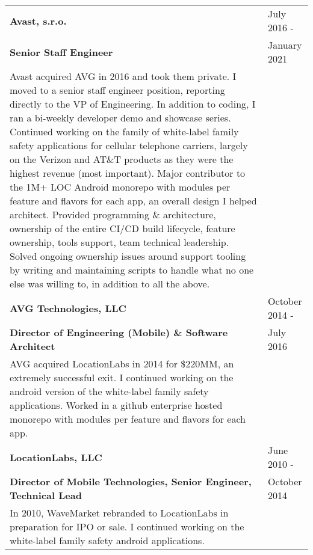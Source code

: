 \begin{tabular}{p{5.2in}@{\hspace{1.5cm}}l}

	\bf  Avast, s.r.o. 	    & July 2016 -  \\
	\bf  Senior Staff Engineer	& January 2021 \\[4pt]
	
	   Avast acquired AVG in 2016 and took them private.  I moved to a senior staff engineer position,
	   reporting directly to the VP of Engineering.  In addition to coding, I ran a bi-weekly developer demo
	   and showcase series.
	   Continued working on the family of white-label family safety applications for cellular
	   telephone carriers, largely on the Verizon and AT\&T products as they were the highest revenue (most important).
	   Major contributor to the 1M+ LOC Android monorepo with modules per feature and flavors for each app,
	   an overall design I helped architect.
	   Provided programming \& architecture, 
		ownership of the entire CI/CD build lifecycle, feature ownership, tools support, team 
		technical leadership. Solved ongoing ownership issues around support tooling by writing and maintaining 
		scripts to handle what no one else was willing to, in addition to all the above. 
		
		 \\[9pt]
	   
	\bf AVG Technologies, LLC 	& October 2014 -  \\
	\bf  Director of Engineering (Mobile)  \& Software Architect 	& July 2016 \\[4pt]
	
	   AVG acquired LocationLabs in 2014 for \$220MM, an extremely successful exit.   I 
	   continued working on the android version of the white-label family safety applications. 
	   Worked in a github enterprise hosted monorepo with modules per feature and flavors for each app.\\[9pt]
	   
	\bf LocationLabs, LLC   & June 2010 -  \\
	\bf   Director of Mobile Technologies, Senior Engineer, Technical Lead	& October 2014 \\[4pt]
	
	   In 2010, WaveMarket rebranded to LocationLabs in preparation for IPO or sale.
	   I continued working on the white-label family safety android applications. \\[9pt]
	   

\end{tabular}

